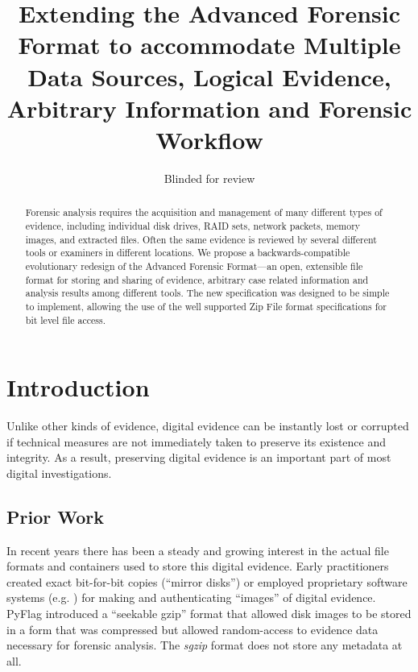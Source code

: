 \documentclass[10pt, conference]{IEEEtran}
\begin{document}
\title{Extending the Advanced Forensic Format to accommodate Multiple
  Data Sources, Logical Evidence, Arbitrary Information and Forensic Workflow}
\author{Blinded for review}
\maketitle

\begin{abstract}
Forensic analysis requires the acquisition and management of many
different types of evidence, including individual disk drives, RAID
sets, network packets, memory images, and extracted files. Often the
same evidence is reviewed by several different tools or examiners in
different locations. We propose a backwards-compatible evolutionary
redesign of the Advanced Forensic Format---an open, extensible file
format for storing and sharing of evidence, arbitrary case related
information and analysis results among different tools. The new
specification was designed to be simple to implement, allowing the use
of the well supported Zip File format specifications for bit level
file access.
\end{abstract}

\section{Introduction}
Unlike other kinds of evidence, digital evidence can be instantly lost
or corrupted if technical measures are not immediately taken to
preserve its existence and integrity. As a result, preserving digital
evidence is an important part of most digital
investigations\cite{carrier:event-based}.

\subsection{Prior Work}
In recent years there has been a steady and growing interest in the
actual file formats and containers used to store this digital
evidence. Early practitioners created exact bit-for-bit copies
(``mirror disks'') or employed proprietary software systems
(e.g. \cite{safeback,ilook,encase}) for making and authenticating
``images'' of digital evidence. PyFlag\cite{pyflag} introduced a
``seekable gzip'' format that allowed disk images to be stored in a
form that was compressed but allowed random-access to evidence data
necessary for forensic analysis. The \emph{sgzip} format does not
store any metadata at all.
\end{document}
